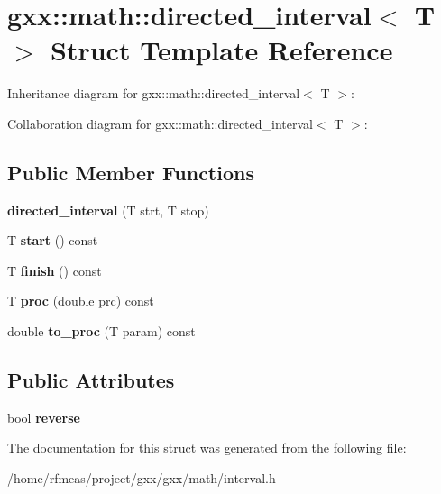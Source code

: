 \hypertarget{structgxx_1_1math_1_1directed__interval}{}\section{gxx\+:\+:math\+:\+:directed\+\_\+interval$<$ T $>$ Struct Template Reference}
\label{structgxx_1_1math_1_1directed__interval}


Inheritance diagram for gxx\+:\+:math\+:\+:directed\+\_\+interval$<$ T $>$\+:


Collaboration diagram for gxx\+:\+:math\+:\+:directed\+\_\+interval$<$ T $>$\+:
\subsection*{Public Member Functions}
\begin{DoxyCompactItemize}
\item 
{\bfseries directed\+\_\+interval} (T strt, T stop)\hypertarget{structgxx_1_1math_1_1directed__interval_a56c727a9876226b8323eef2ec8f467f2}{}\label{structgxx_1_1math_1_1directed__interval_a56c727a9876226b8323eef2ec8f467f2}

\item 
T {\bfseries start} () const \hypertarget{structgxx_1_1math_1_1directed__interval_a4a7f41f73a08e7d79ab7a4dd1b040e2d}{}\label{structgxx_1_1math_1_1directed__interval_a4a7f41f73a08e7d79ab7a4dd1b040e2d}

\item 
T {\bfseries finish} () const \hypertarget{structgxx_1_1math_1_1directed__interval_aa966173ddac24be355e4da10fce0d187}{}\label{structgxx_1_1math_1_1directed__interval_aa966173ddac24be355e4da10fce0d187}

\item 
T {\bfseries proc} (double prc) const \hypertarget{structgxx_1_1math_1_1directed__interval_ae816022ac342134d35d5af4c200f0748}{}\label{structgxx_1_1math_1_1directed__interval_ae816022ac342134d35d5af4c200f0748}

\item 
double {\bfseries to\+\_\+proc} (T param) const \hypertarget{structgxx_1_1math_1_1directed__interval_ac74ae93897c07b766cba868777d5f686}{}\label{structgxx_1_1math_1_1directed__interval_ac74ae93897c07b766cba868777d5f686}

\end{DoxyCompactItemize}
\subsection*{Public Attributes}
\begin{DoxyCompactItemize}
\item 
bool {\bfseries reverse}\hypertarget{structgxx_1_1math_1_1directed__interval_a54217a3c25abb1c06c23505cac30fdfd}{}\label{structgxx_1_1math_1_1directed__interval_a54217a3c25abb1c06c23505cac30fdfd}

\end{DoxyCompactItemize}


The documentation for this struct was generated from the following file\+:\begin{DoxyCompactItemize}
\item 
/home/rfmeas/project/gxx/gxx/math/interval.\+h\end{DoxyCompactItemize}
